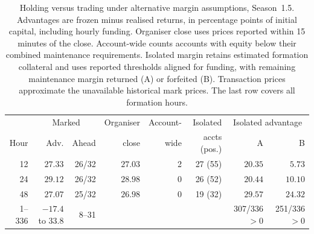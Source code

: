 \begin{table}[ht]
\centering\small
\caption{Holding versus trading under alternative margin assumptions,
Season~1.5. Advantages are frozen minus realised returns, in percentage
points of initial capital, including hourly funding. Organiser close uses
prices reported within 15 minutes of the close. Account-wide counts
accounts with equity below their combined maintenance requirements.
Isolated margin retains estimated formation collateral and uses
reported thresholds aligned for funding, with remaining maintenance margin
returned (A) or forfeited (B). Transaction prices approximate the
unavailable historical mark prices. The last row covers all formation hours.}
\label{tab:orghourly}
\setlength{\tabcolsep}{4pt}
\begin{tabular}{rrrrrrrr}
\toprule
 & \multicolumn{2}{c}{Marked} & Organiser & Account- & Isolated & \multicolumn{2}{c}{Isolated advantage} \\
Hour & Adv. & Ahead & close & wide & accts (pos.) & A & B \\
\midrule
12 & $27.33$ & 26/32 & $27.03$ & 2 & 27 (55) & $20.35$ & $5.73$ \\
24 & $29.12$ & 26/32 & $28.98$ & 0 & 26 (52) & $20.44$ & $10.10$ \\
48 & $27.07$ & 25/32 & $26.98$ & 0 & 19 (32) & $29.57$ & $24.32$ \\
1--336 & $-17.4$ to $33.8$ & 8--31 & & & & 307/336 $>0$ & 251/336 $>0$ \\
\bottomrule
\end{tabular}
\end{table}

